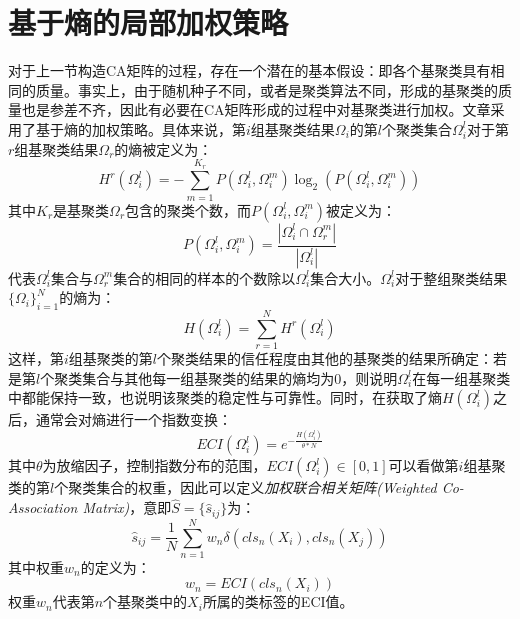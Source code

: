 \documentclass[UTF8, 12pt]{ctexart}
\begin{document}
\section{基于熵的局部加权策略}
	对于上一节构造CA矩阵的过程，存在一个潜在的基本假设：即各个基聚类具有相同的质量。事实上，由于随机种子不同，或者是聚类算法不同，形成的基聚类的质量也是参差不齐，因此有必要在CA矩阵形成的过程中对基聚类进行加权。文章\cite{huang2017locally}采用了基于熵的加权策略。具体来说，第$i$组基聚类结果$\Omega_{i}$的第$l$个聚类集合$\Omega_{i}^{l}$对于第$r$组基聚类结果$\Omega_{r}$的熵被定义为：
	\begin{equation}
		H^{r}(\Omega_{i}^{l}) = - \sum_{m=1}^{K_{r}} {P(\Omega_{i}^{l}, \Omega_{i}^{m}) \log_{2}(P(\Omega_{i}^{l}, \Omega_{i}^{m}))}
	\end{equation}
	其中$K_{r}$是基聚类$\Omega_{r}$包含的聚类个数，而$P(\Omega_{i}^{l}, \Omega_{i}^{m})$被定义为：
	\begin{equation}
		P(\Omega_{i}^{l}, \Omega_{i}^{m}) = \frac{|\Omega_{i}^{l} \cap \Omega_{r}^{m}| }{|\Omega_{i}^{l}|}
	\end{equation}
	代表$\Omega_{i}^{l}$集合与$\Omega_{r}^{m}$集合的相同的样本的个数除以$\Omega_{i}^{l}$集合大小。$\Omega_{i}^{l}$对于整组聚类结果$\{\Omega_{i}\}_{i=1}^{N}$的熵为：
	\begin{equation}
		H(\Omega_{i}^{l}) = \sum_{r=1}^{N}H^{r}(\Omega_{i}^{l})
	\end{equation}
	这样，第$i$组基聚类的第$l$个聚类结果的信任程度由其他的基聚类的结果所确定：若是第$l$个聚类集合与其他每一组基聚类的结果的熵均为0，则说明$\Omega_{i}^{l}$在每一组基聚类中都能保持一致，也说明该聚类的稳定性与可靠性。同时，在获取了熵$H(\Omega_{i}^{l})$之后，通常会对熵进行一个指数变换：
	\begin{equation}
		ECI(\Omega_{i}^{l}) = e^{-\frac{H(\Omega_{i}^{l})}{\theta * N}}
	\end{equation}
	其中$\theta$为放缩因子，控制指数分布的范围，$ECI(\Omega_{i}^{l}) \in [0, 1]$可以看做第$i$组基聚类的第$l$个聚类集合的权重，因此可以定义\emph{加权联合相关矩阵(Weighted Co-Association Matrix)}，意即$\hat{S}=\{\hat{s}_{ij}\}$为：
	\begin{equation}
		\hat{s}_{ij} = \frac{1}{N} \sum_{n=1}^{N} w_{n}\delta(cls_{n}(X_{i}), cls_{n}(X_{j}))
	\end{equation}
	其中权重$w_{n}$的定义为：
	\begin{equation}
		w_{n} = ECI(cls_{n}(X_{i}))
	\end{equation}
	权重$w_{n}$代表第$n$个基聚类中的$X_{i}$所属的类标签的ECI值。
	
\end{document}
